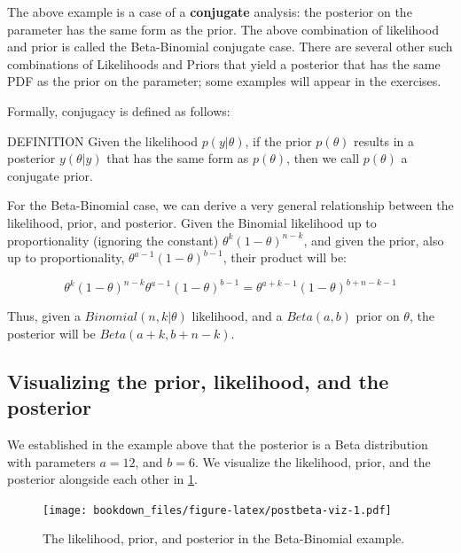 \documentclass[12pt,]{krantz}
\renewenvironment{quote}{\begin{VF}}{\end{VF}}
\theoremstyle{definition}
\theoremstyle{definition}
\theoremstyle{definition}
\theoremstyle{remark}
\begin{document}
The above example is a case of a \textbf{conjugate} analysis: the posterior on the parameter has the same form as the prior. The above combination of likelihood and prior is called the Beta-Binomial conjugate case. There are several other such combinations of Likelihoods and Priors that yield a posterior that has the same PDF as the prior on the parameter; some examples will appear in the exercises.

Formally, conjugacy is defined as follows:

\begin{quote}
DEFINITION
Given the likelihood \(p(y| \theta)\), if the prior \(p(\theta)\) results in a posterior \(y(\theta|y)\) that has the same form as \(p(\theta)\), then we call \(p(\theta)\) a conjugate prior.
\end{quote}

For the Beta-Binomial case, we can derive a very general relationship between the likelihood, prior, and posterior. Given the Binomial likelihood up to proportionality (ignoring the constant) \(\theta^k (1-\theta)^{n-k}\), and given the prior, also up to proportionality, \(\theta^{a-1} (1-\theta)^{b-1}\), their product will be:

\begin{equation}
\theta^k (1-\theta)^{n-k} \theta^{a-1} (1-\theta)^{b-1} = \theta^{a+k-1} (1-\theta)^{b+n-k-1} 
\end{equation}

Thus, given a \(Binomial(n,k|\theta)\) likelihood, and a \(Beta(a,b)\) prior on \(\theta\), the posterior will be \(Beta(a+k,b+n-k)\).

\hypertarget{visualizing-the-prior-likelihood-and-the-posterior}{%
\subsection{Visualizing the prior, likelihood, and the posterior}\label{visualizing-the-prior-likelihood-and-the-posterior}}

We established in the example above that the posterior is a Beta distribution with parameters \(a=12\), and \(b = 6\). We visualize the likelihood, prior, and the posterior alongside each other in \ref{fig:postbeta-viz}.

\begin{figure}
\centering
\texttt{[image: bookdown\_files/figure-latex/postbeta-viz-1.pdf]}
\caption{\label{fig:postbeta-viz}The likelihood, prior, and posterior in the Beta-Binomial example.}
\end{figure}
\end{document}

